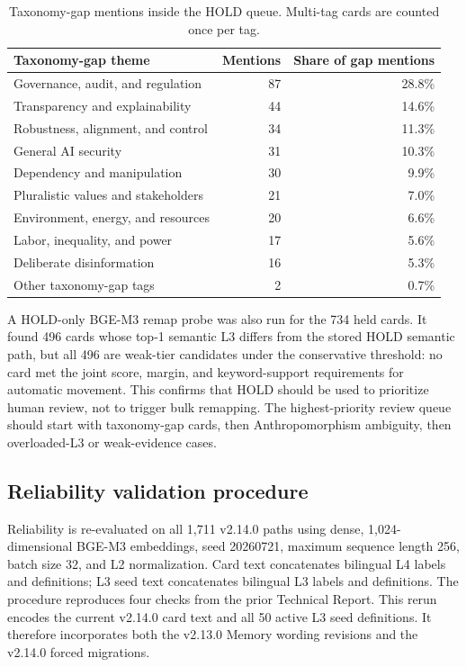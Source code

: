 \documentclass[11pt,a4paper]{article}
\begin{document}
\begin{table}[ht]
\centering
\caption{Taxonomy-gap mentions inside the HOLD queue. Multi-tag cards are
counted once per tag.}
\label{tab:hold-taxonomy-gap-v217}
\begin{tabular}{lrr}
\toprule
Taxonomy-gap theme & Mentions & Share of gap mentions \\
\midrule
Governance, audit, and regulation & 87 & 28.8\% \\
Transparency and explainability & 44 & 14.6\% \\
Robustness, alignment, and control & 34 & 11.3\% \\
General AI security & 31 & 10.3\% \\
Dependency and manipulation & 30 & 9.9\% \\
Pluralistic values and stakeholders & 21 & 7.0\% \\
Environment, energy, and resources & 20 & 6.6\% \\
Labor, inequality, and power & 17 & 5.6\% \\
Deliberate disinformation & 16 & 5.3\% \\
Other taxonomy-gap tags & 2 & 0.7\% \\
\bottomrule
\end{tabular}
\end{table}

A HOLD-only BGE-M3 remap probe was also run for the 734 held cards. It found
496 cards whose top-1 semantic L3 differs from the stored HOLD semantic path,
but all 496 are weak-tier candidates under the conservative threshold: no card
met the joint score, margin, and keyword-support requirements for automatic
movement. This confirms that HOLD should be used to prioritize human review,
not to trigger bulk remapping. The highest-priority review queue should start
with taxonomy-gap cards, then Anthropomorphism ambiguity, then overloaded-L3
or weak-evidence cases.

\subsection{Reliability validation procedure}

Reliability is re-evaluated on all 1,711 v2.14.0 paths using dense,
1,024-dimensional BGE-M3 embeddings, seed 20260721, maximum sequence length
256, batch size 32, and L2 normalization. Card text concatenates bilingual L4
labels and definitions; L3 seed text concatenates bilingual L3 labels and
definitions. The procedure reproduces four checks from the prior Technical
Report. This rerun encodes the current v2.14.0 card text and all 50 active L3
seed definitions. It therefore incorporates both the v2.13.0 Memory wording
revisions and the v2.14.0 forced migrations.
\end{document}

